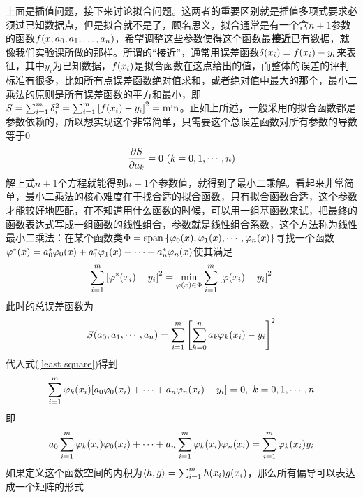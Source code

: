 \documentclass[12pt,a4paper,openany,twoside]{book}
\numberwithin{equation}{section}
\newcommand{\mean}[1]{\left\langle #1 \right\rangle}
\begin{document}
          上面是插值问题，接下来讨论拟合问题。这两者的重要区别就是插值多项式要求必须过已知数据点，但是拟合就不是了，顾名思义，拟合通常是有一个含$n+1$参数的函数$f\qty(x;a_0,a_1,\dots,a_n)$，希望调整这些参数使得这个函数最\textbf{接近}已有数据，就像我们实验课所做的那样。所谓的“接近”，通常用误差函数$\delta\qty(x_i)=f\qty(x_i)-y_i$来表征，其中$y_i$为已知数据，$f\qty(x_i)$是拟合函数在这点给出的值，而整体的误差的评判标准有很多，比如所有点误差函数绝对值求和，或者绝对值中最大的那个，最小二乘法的原则是所有误差函数的平方和最小，即$S=\sum_{i=1}^m{\delta_i^2}=\sum_{i=1}^m{\qty[f\qty(x_{i})-y_{i}]^{2}}=\min$。正如上所述，一般采用的拟合函数都是参数依赖的，所以想实现这个非常简单，只需要这个总误差函数对所有参数的导数等于0
          \begin{equation}
            \pdv{S}{a_k}=0\ \qty(k=0,1,\cdots,n)
            \label{least square}
          \end{equation}
          解上式$n+1$个方程就能得到$n+1$个参数值，就得到了最小二乘解。看起来非常简单，最小二乘法的核心难度在于找合适的拟合函数，只有拟合函数合适，这个参数才能较好地匹配，在不知道用什么函数的时候，可以用一组基函数来试，把最终的函数表达式写成一组函数的线性组合，参数就是线性组合系数，这个方法称为线性最小二乘法：在某个函数类$\Phi=\operatorname{span}\qty{\varphi_0\qty(x),\varphi_1\qty(x),\cdots,\varphi_n\qty(x)}$寻找一个函数$\varphi^*\qty(x)=a_0^*\varphi_0\qty(x)+a_1^*\varphi_1\qty(x)+\cdots+a_n^*\varphi_n\qty(x)$使其满足
          \begin{equation}
            \sum_{i=1}^m{\qty[\varphi^*\qty(x_i)-y_i]^2}=\min_{\varphi\qty(x)\in\Phi}\sum_{i=1}^m{\qty[\varphi\qty(x_i)-y_i]^2}
          \end{equation}
          此时的总误差函数为
          \begin{equation}
            S\qty(a_0,a_1,\cdots,a_n)=\sum_{i=1}^m{\qty[\sum_{k=0}^n{a_k\varphi_k\qty(x_i)}-y_i]^2}
          \end{equation}
          代入式(\ref{least square})得到
          \begin{equation}
            \sum_{i=1}^m{\varphi_k\qty(x_i)\qty[a_0\varphi_0\qty(x_i)+\cdots+a_n\varphi_n\qty(x_i)-y_i]}=0,\ k=0,1,\cdots,n
          \end{equation}
          即
          \begin{equation}
            a_0\sum_{i=1}^m{\varphi_k\qty(x_i)\varphi_0\qty(x_i)}+\cdots+a_n\sum_{i=1}^m{\varphi_k\qty(x_i)\varphi_n\qty(x_i)}=\sum_{i=1}^m{\varphi_k\qty(x_i)y_i}
          \end{equation}
          如果定义这个函数空间的内积为$\mean{h,g}=\sum_{i=1}^m{h\qty(x_i)g\qty(x_i)}$，那么所有偏导可以表达成一个矩阵的形式
\end{document}
